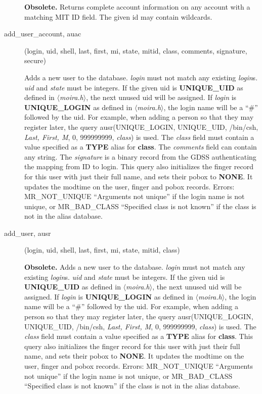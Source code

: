 \begin{description}
{\bf Obsolete.}  Returns complete account information on any account
with a matching MIT ID field.  The given id may contain wildcards.

\item[add\_user\_account, auac](login, uid, shell, last, first, mi, state, mitid,
class, comments, signature, secure)

Adds a new user to the database. {\em login} must not match any
existing {\em login}s. {\em uid} and {\em state} must be integers. If
the given uid is {\bf UNIQUE\_UID} as defined in {\em
$\langle$moira.h$\rangle$}, the next unused uid will be assigned. If
{\em login} is {\bf UNIQUE\_LOGIN} as defined in {\em
$\langle$moira.h$\rangle$}, the login name will be a ``\#'' followed by
the uid. For example, when adding a person so that they may register
later, the query ausr(UNIQUE\_LOGIN, UNIQUE\_UID, /bin/csh, {\em Last,
First, M}, 0, 999999999, {\em class}) is used. The {\em class}
field must contain a value specified as a {\bf TYPE} alias for {\bf
class}. The {\em comments} field can contain any string. The {\em
signature} is a binary record from the GDSS authenticating the mapping
from ID to login. This query also initializes the finger record for
this user with just their full name, and sets their pobox to {\bf
NONE}. It updates the modtime on the user, finger and pobox records.
Errors: MR\_NOT\_UNIQUE ``Arguments not unique'' if the login name is not
unique, or MR\_BAD\_CLASS ``Specified class is not known'' if the class is
not in the alias database.

\item[add\_user, ausr](login, uid, shell, last, first, mi, state, mitid,
class)

{\bf Obsolete.} Adds a new user to the database. {\em login} must not
match any existing {\em login}s. {\em uid} and {\em state} must be
integers. If the given uid is {\bf UNIQUE\_UID} as defined in {\em
$\langle$moira.h$\rangle$}, the next unused uid will be assigned. If
{\em login} is {\bf UNIQUE\_LOGIN} as defined in {\em
$\langle$moira.h$\rangle$}, the login name will be a ``\#'' followed by
the uid. For example, when adding a person so that they may register
later, the query ausr(UNIQUE\_LOGIN, UNIQUE\_UID, /bin/csh, {\em Last,
First, M}, 0, 999999999, {\em class}) is used. The {\em class} field
must contain a value specified as a {\bf TYPE} alias for {\bf class}.
This query also initializes the finger record for this user with just
their full name, and sets their pobox to {\bf NONE}. It updates the
modtime on the user, finger and pobox records. Errors: MR\_NOT\_UNIQUE
``Arguments not unique'' if the login name is not unique, or
MR\_BAD\_CLASS ``Specified class is not known'' if the class is not in the
alias database.


\end{description}
